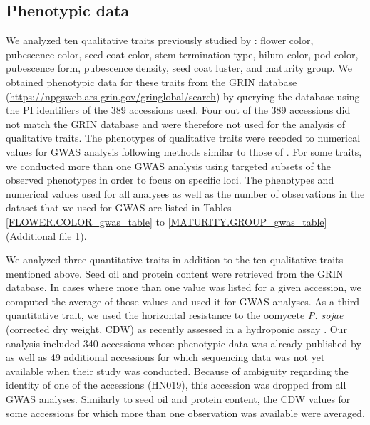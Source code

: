 \subsection*{Phenotypic data}
\label{sv-gwas-phenotypic-data}

We analyzed ten qualitative traits previously studied by \cite{bandillo2017}: flower
color, pubescence color, seed coat color, stem termination type, hilum color,
pod color, pubescence form, pubescence density, seed coat luster, and maturity
group.  We obtained phenotypic data for these traits from the GRIN database
(\url{https://npgsweb.ars-grin.gov/gringlobal/search}) by querying the database
using the PI identifiers of the 389 accessions used.  Four out of the 389
accessions did not match the GRIN database and were therefore not used for the
analysis of qualitative traits. The phenotypes of qualitative traits were recoded
to numerical values for GWAS analysis following methods similar to those of
\cite{bandillo2017}.  For some traits, we conducted more than one GWAS analysis
using targeted subsets of the observed phenotypes in order to focus on specific
loci. The phenotypes and numerical values used for all analyses as well as the
number of observations in the dataset that we used for GWAS are listed in
Tables \ref{FLOWER.COLOR_gwas_table} to \ref{MATURITY.GROUP_gwas_table} (Additional file 1).

We analyzed three quantitative traits in addition to the ten qualitative traits
mentioned above. Seed oil and protein content were retrieved from the GRIN
database. In cases where more than one value was listed for a given accession,
we computed the average of those values and used it for GWAS analyses. As a third quantitative trait, we
used the horizontal resistance to the oomycete \textit{P. sojae} (corrected dry
weight, CDW) as recently assessed in a hydroponic assay \citep{deronne2022}.
Our analysis included 340 accessions whose phenotypic data
was already published by \cite{deronne2022} as well as 49 additional accessions for
which sequencing data was not yet available when their study was conducted.
Because of ambiguity regarding the identity of one of the accessions (HN019), this accession
was dropped from all GWAS analyses. Similarly to seed oil and
protein content, the CDW values for some accessions for which more than one
observation was available were averaged.


